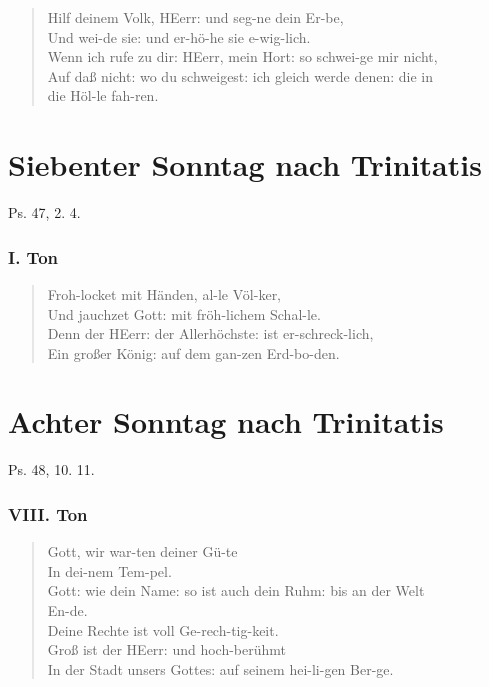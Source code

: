 \begin{verse}
Hilf deinem Volk, HEerr: und seg-ne dein Er-be,\\
Und wei-de sie: und er-hö-he sie e-wig-lich.\\
Wenn ich rufe zu dir: HEerr, mein Hort: so schwei-ge mir nicht,\\
Auf daß nicht: wo du schweigest: ich gleich werde denen: die in\\
die Höl-le fah-ren.
\end{verse}

\section{Siebenter Sonntag nach Trinitatis}

Ps. 47, 2. 4.

\subsubsection{I. Ton}
\begin{verse}
Froh-locket mit Händen, al-le Völ-ker,\\
Und jauchzet Gott: mit fröh-lichem Schal-le.\\
Denn der HEerr: der Allerhöchste: ist er-schreck-lich,\\
Ein großer König: auf dem gan-zen Erd-bo-den.
\end{verse}

\section{Achter Sonntag nach Trinitatis}

Ps. 48, 10. 11.

\subsubsection{VIII. Ton}
\begin{verse}
Gott, wir war-ten deiner Gü-te\\
In dei-nem Tem-pel.\\
Gott: wie dein Name: so ist auch dein Ruhm: bis an der Welt\\
En-de.\\
Deine Rechte ist voll Ge-rech-tig-keit.\\
Groß ist der HEerr: und hoch-berühmt\\
In der Stadt unsers Gottes: auf seinem hei-li-gen Ber-ge.
\end{verse}

